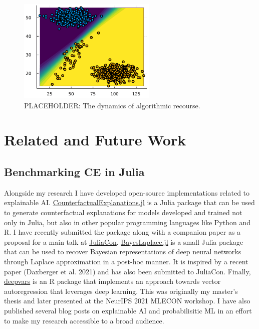 \documentclass[
]{acmconf}
\begin{document}
\begin{figure}

{\centering \includegraphics[width=2.60417in,height=\textheight]{www/dynamics.png}

}

\caption{\label{fig-dynamics}PLACEHOLDER: The dynamics of algorithmic
recourse.}

\end{figure}

\hypertarget{sec-related}{%
\section{Related and Future Work}\label{sec-related}}

\hypertarget{benchmarking-ce-in-julia}{%
\subsection{Benchmarking CE in Julia}\label{benchmarking-ce-in-julia}}

Alongside my research I have developed open-source implementations
related to explainable AI.
\href{https://www.paltmeyer.com/CounterfactualExplanations.jl/stable/}{CounterfactualExplanations.jl}
is a Julia package that can be used to generate counterfactual
explanations for models developed and trained not only in Julia, but
also in other popular programming languages like Python and R. I have
recently submitted the package along with a companion paper as a
proposal for a main talk at \href{https://juliacon.org/2022/}{JuliaCon}.
\href{https://www.paltmeyer.com/BayesLaplace.jl/dev/}{BayesLaplace.jl}
is a small Julia package that can be used to recover Bayesian
representations of deep neural networks through Laplace approximation in
a post-hoc manner. It is inspired by a recent paper (Daxberger et al.
2021) and has also been submitted to JuliaCon. Finally,
\href{https://github.com/pat-alt/deepvars}{deepvars} is an R package
that implements an approach towards vector autoregression that leverages
deep learning. This was originally my master's thesis and later
presented at the NeurIPS 2021 MLECON workshop. I have also published
several blog posts on explainable AI and probabilisitic ML in an effort
to make my research accessible to a broad audience.
\end{document}
